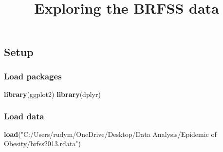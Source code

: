 \documentclass[
]{article}
\title{Exploring the BRFSS data}
\author{}
\date{\vspace{-2.5em}}
\newenvironment{Shaded}{\begin{snugshade}}{\end{snugshade}}
\newcommand{\KeywordTok}[1]{\textcolor[rgb]{0.13,0.29,0.53}{\textbf{#1}}}
\newcommand{\NormalTok}[1]{#1}
\newcommand{\OperatorTok}[1]{\textcolor[rgb]{0.81,0.36,0.00}{\textbf{#1}}}
\newcommand{\StringTok}[1]{\textcolor[rgb]{0.31,0.60,0.02}{#1}}
\begin{document}
\maketitle

\hypertarget{setup}{%
\subsection{Setup}\label{setup}}

\hypertarget{load-packages}{%
\subsubsection{Load packages}\label{load-packages}}

\begin{Shaded}
\begin{Highlighting}[]
\KeywordTok{library}\NormalTok{(ggplot2)}
\KeywordTok{library}\NormalTok{(dplyr)}
\end{Highlighting}
\end{Shaded}

\hypertarget{load-data}{%
\subsubsection{Load data}\label{load-data}}

\begin{Shaded}
\begin{Highlighting}[]
\KeywordTok{load}\NormalTok{(}\StringTok{"C:/Users/rudym/OneDrive/Desktop/Data Analysis/Epidemic of Obesity/brfss2013.rdata"}\NormalTok{)}
\end{Highlighting}
\end{Shaded}

\begin{Shaded}
\end{Shaded}
\end{document}
